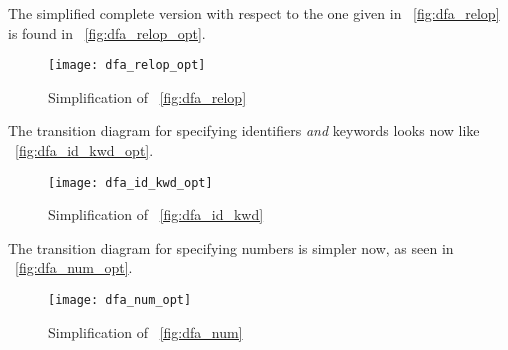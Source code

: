 The simplified complete version with respect to the one given in
\fig~\vref{fig:dfa_relop} is found in \fig~\vref{fig:dfa_relop_opt}.
\begin{figure}
\centering
\texttt{[image: dfa\_relop\_opt]}
\caption{Simplification of \fig~\vref{fig:dfa_relop}}
\label{fig:dfa_relop_opt}
\end{figure}
The transition diagram for specifying identifiers \emph{and} keywords
looks now like \fig~\vref{fig:dfa_id_kwd_opt}.
\begin{figure}
\centering
\texttt{[image: dfa\_id\_kwd\_opt]}
\caption{Simplification of \fig~\vref{fig:dfa_id_kwd}}
\label{fig:dfa_id_kwd_opt}
\end{figure}
The transition diagram for specifying numbers is simpler now, as seen
in \fig~\vref{fig:dfa_num_opt}.
\begin{figure}
\centering
\texttt{[image: dfa\_num\_opt]}
\caption{Simplification of \fig~\vref{fig:dfa_num}}
\label{fig:dfa_num_opt}
\end{figure}

